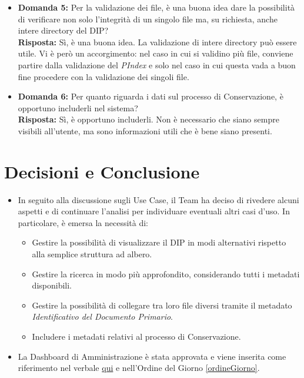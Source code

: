 \documentclass[a4paper,12pt]{article}
\begin{document}
\begin{itemize}
    \item \textbf{Domanda 5:} Per la validazione dei file, è una buona idea dare la possibilità di verificare non solo l'integrità di un singolo file ma, su richiesta, anche intere directory del DIP?
   \\ \textbf{Risposta:} Sì, è una buona idea. La validazione di intere directory può essere utile. Vi è però un accorgimento: nel caso in cui si validino più file, conviene partire dalla validazione del \textit{PIndex} e solo nel caso in cui questa vada a buon fine procedere con la validazione dei singoli file.

    \item \textbf{Domanda 6:} Per quanto riguarda i dati sul processo di Conservazione, è opportuno includerli nel sistema?
    \\ \textbf{Risposta:} Sì, è opportuno includerli. Non è necessario che siano sempre visibili all'utente, ma sono informazioni utili che è bene siano presenti.
\end{itemize}


\section{Decisioni e Conclusione}
\begin{itemize}
    \item In seguito alla discussione sugli Use Case, il Team ha deciso di rivedere alcuni aspetti e di continuare l'analisi per individuare eventuali altri casi d'uso.
     In particolare, è emersa la necessità di:
    \begin{itemize}
        \item Gestire la possibilità di visualizzare il DIP in modi alternativi rispetto alla semplice struttura ad albero.
        \item Gestire la ricerca in modo più approfondito, considerando tutti i metadati disponibili.
        \item Gestire la possibilità di collegare tra loro file diversi tramite il metadato \textit{Identificativo del Documento Primario}.
        \item Includere i metadati relativi al processo di Conservazione.
    \end{itemize}
    \item La Dashboard di Amministrazione è stata approvata e viene inserita come riferimento nel verbale \href{https://dashboardhub-eu.appfire.app/jira/shared/dashboard?boardToken=VTJGc2RHVmtYMTlTQTJITnoxazdZc1hBRFdUWWRSZVIxK1NSR2x2QXprUGk0bXV6WXVka1JZRGFUL3lWeUFqVWZ3dXlmRGhPZ3FrS3ZkaXVyd1FiV3NZUmJxWVV5K2UzOUVPQlJhbVlCbllCeVJ3UEQzWSt1LzZvRmlXaTJ3SE0rbjZxZHFtNkY4QXRhYWRzRzhVYnpaL2llQzErWXBxN21NZFNxVmhQbEhEN0g1ZGJtbHVDY3hqZTlVMTJ0VnkwdE9GQXBsZFRmeWF3dHpLK0tudmg1a1BCcDhMRUhwZFRaZjhnZXpPYlJiNEFMZTJtbUFkZjlHS3gwell6TDY2cldXR3BFN2dlK0xXNDRURVlYUHpLdFE9PQ%3D%3D}{qui} e nell'Ordine del Giorno \ref{ordineGiorno}.
\end{itemize}
\end{document}
